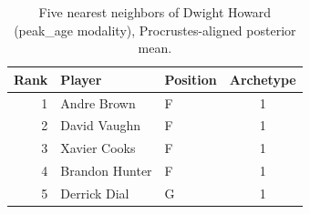 \begin{table}[htbp]
  \centering\small
  \begin{tabular}{rllc}
    \toprule
    Rank & Player & Position & Archetype \\
    \midrule
    1 & Andre Brown & F & 1 \\
    2 & David Vaughn & F & 1 \\
    3 & Xavier Cooks & F & 1 \\
    4 & Brandon Hunter & F & 1 \\
    5 & Derrick Dial & G & 1 \\
    \bottomrule
  \end{tabular}
  \caption{Five nearest neighbors of Dwight Howard (peak_age modality), Procrustes-aligned posterior mean.}
  \label{tab:Dwight_Howard_neighbors_peak_age}
\end{table}

